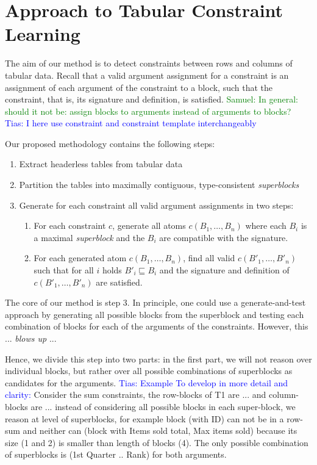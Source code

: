 \documentclass{IEEEtran}
\newcommand{\samuel}[1]{\textcolor{green}{{\sc Samuel:} #1}\xspace}
\newcommand{\tias}[1]{\textcolor{blue}{{\sc Tias:} #1}\xspace}
\theoremstyle{definition}
\begin{document}





\newcommand{\tcl}{Tabular Constraint Learning}
\section{Approach to Tabular Constraint Learning}\label{sec:approach}
The aim of our method is to detect constraints between rows and columns of tabular data. Recall that a valid argument assignment for a constraint is an assignment of each argument of the constraint to a block, such that the constraint, that is, its signature and definition, is satisfied.
\samuel{In general: should it not be: assign blocks to arguments instead of arguments to blocks?}
\tias{I here use constraint and constraint template interchangeably}

Our proposed methodology contains the following steps:
\begin{enumerate}
\item Extract headerless tables from tabular data
\item Partition the tables into maximally contiguous, type-consistent \textit{superblocks}
\item Generate for each constraint all valid argument assignments in two steps:
\begin{enumerate}
\item For each constraint $c$, generate all atoms $c(B_1, \ldots ,B_n)$ where each $B_i$ is a maximal \textit{superblock} and the $B_i$ are compatible with the signature.
\item For each generated atom $c(B_1, \ldots ,B_n)$, find all valid $c(B'_1, \ldots, B'_n)$ such that for all $i$ holds $B'_i \sqsubseteq B_i$ and the signature and definition of $c(B'_1, \ldots, B'_n)$ are satisfied.
\end{enumerate}
\end{enumerate}

The core of our method is step 3. In principle, one could use a generate-and-test approach by generating all possible blocks from the superblock and testing each combination of blocks for each of the arguments of the constraints. However, this ... \textit{blows up} ...

Hence, we divide this step into two parts: in the first part, we will not reason over individual blocks, but rather over all possible combinations of superblocks as candidates for the arguments.
\tias{Example To develop in more detail and clarity:}
Consider the sum constraints, the row-blocks of T1 are ... and column-blocks are ... instead of considering all possible blocks in each super-block, we reason at level of superblocks, for example block (with ID) can not be in a row-sum and neither can (block with Items sold total, Max items sold) because its size (1 and 2) is smaller than length of blocks (4). The only possible combination of superblocks is (1st Quarter .. Rank) for both arguments.
\end{document}
